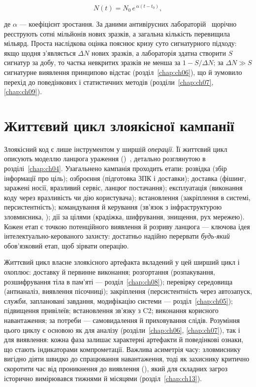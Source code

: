 \begin{equation}
N(t) = N_0\,e^{\,\alpha (t-t_0)},
\label{eq:ch01-growth}
\end{equation}

де $\alpha$ --- коефіцієнт зростання. За даними антивірусних лабораторій~\cite{ch01:avtest} щорічно реєструють сотні мільйонів нових зразків, а загальна кількість перевищила мільярд. Проста наслідкова оцінка пояснює кризу суто сигнатурного підходу: якщо щодня з'являється $\Delta N$ нових зразків, а лабораторія здатна створити $S$ сигнатур за добу, то частка невкритих зразків не менша за $1-S/\Delta N$; за $\Delta N \gg S$ сигнатурне виявлення принципово відстає (розділ~\ref{chap:ch06}), що й зумовило перехід до поведінкових і статистичних методів (розділи~\ref{chap:ch07}, \ref{chap:ch09}).

\section{Життєвий цикл злоякісної кампанії}\label{sec:ch01-lifecycle}

Злоякісний код є лише інструментом у ширшій \emph{операції}. Її життєвий цикл описують моделлю ланцюга ураження ()~\cite{lockheed-kc}, детально розглянутою в розділі~\ref{chap:ch04}. Узагальнено кампанія проходить етапи: розвідка (збір інформації про ціль); озброєння (підготовка ЗПК і доставки); доставка (фішинг, заражені носії, вразливий сервіс, ланцюг постачання); експлуатація (виконання коду через вразливість чи дію користувача); встановлення (закріплення в системі, персистентність); командування й керування (зв'язок з інфраструктурою зловмисника, ); дії за цілями (крадіжка, шифрування, знищення, рух мережею). Кожен етап є точкою потенційного виявлення й розриву ланцюга --- ключова ідея інтелектуально-керованого захисту: достатньо надійно перервати \emph{будь-який} обов'язковий етап, щоб зірвати операцію.

Життєвий цикл власне злоякісного артефакта вкладений у цей ширший цикл і охоплює: доставку й первинне виконання; розгортання (розпакування, розшифрування тіла в пам'яті --- розділ~\ref{chap:ch08}); перевірку середовища (антианаліз, виявлення пісочниці); закріплення (персистентність через автозапуск, служби, заплановані завдання, модифікацію системи --- розділ~\ref{chap:ch05}); підвищення привілеїв; встановлення зв'язку з C2; виконання корисного навантаження; за потреби --- самовидалення й приховування слідів. Розуміння цього циклу є основою як для аналізу (розділи~\ref{chap:ch06}, \ref{chap:ch07}), так і для виявлення: кожна фаза залишає характерні артефакти й поведінкові ознаки, що стають індикаторами компрометації. Важлива асиметрія часу: зловмиснику вигідно діяти швидко до спрацювання навантаження, тоді як захиснику критично скоротити час від проникнення до виявлення (), який для складних загроз історично вимірювався тижнями й місяцями (розділ~\ref{chap:ch13}).

